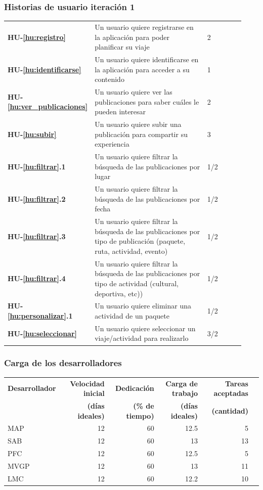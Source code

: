 \documentclass[spanish]{beamer}
\begin{document}
{\small
\begin{frame}[allowframebreaks=0.9]
	\frametitle{Historias de usuario iteración 1}
	\begin{longtable}{p{0.13\linewidth}p{0.65\linewidth}p{0.05\linewidth}p{0.05\linewidth}p{0.05\linewidth}}
		\textbf{HU-\ref{hu:registro}} & Un usuario quiere registrarse en la aplicación para poder planificar su viaje & 2\\
		\textbf{HU-\ref{hu:identificarse}} & Un usuario quiere identificarse en la aplicación para  acceder a su contenido & 1\\
		\textbf{HU-\ref{hu:ver_publicaciones}} & Un usuario quiere ver las publicaciones para saber cuáles le pueden interesar & 2\\
		\textbf{HU-\ref{hu:subir}} & Un usuario quiere subir una publicación para compartir su experiencia & 3\\
		\textbf{HU-\ref{hu:filtrar}.1} & Un usuario quiere filtrar la búsqueda de las publicaciones por lugar & 1/2 \\ 
		\textbf{HU-\ref{hu:filtrar}.2} & Un usuario quiere filtrar la búsqueda de las publicaciones por fecha & 1/2 \\
		\textbf{HU-\ref{hu:filtrar}.3} & Un usuario quiere filtrar la búsqueda de las publicaciones por tipo de publicación (paquete, ruta, actividad, evento) & 1/2 \\
		\textbf{HU-\ref{hu:filtrar}.4} & Un usuario quiere filtrar la búsqueda de las publicaciones por tipo de actividad (cultural, deportiva, etc)) & 1/2 \\
		\textbf{HU-\ref{hu:personalizar}.1} & Un usuario quiere eliminar una actividad de un paquete & 1/2\\ 
		\textbf{HU-\ref{hu:seleccionar}} & Un usuario quiere seleccionar un viaje/actividad para realizarlo & 3/2 \\
	\end{longtable}
\end{frame}
}

\begin{frame}
	\frametitle{Carga de los desarrolladores}
	\begin{table}[H]
	  \centering
	  \begin{adjustbox}{width=\textwidth}
	\begin{tabular}{lrrrrr}
	  \toprule
	  \textbf{Desarrollador} & \textbf{Velocidad inicial} & \textbf{Dedicación} & \textbf{Carga de trabajo} & \textbf{Tareas aceptadas} \\
	  & \textbf{(días ideales)} & \textbf{(\% de tiempo)} & \textbf{(días ideales)} & \textbf{ (cantidad)}\\
	  \midrule
	  MAP & 12 & 60 & 12.5 & 5\\
	  SAB & 12 & 60 & 13 & 13\\
	  PFC & 12 & 60 & 12.5 & 5\\
	  MVGP & 12 & 60 & 13 & 11\\
	  LMC & 12 & 60 & 12.2 & 10\\
	  \bottomrule
	\end{tabular}
	\end{adjustbox}
	\end{table}
\end{frame}
\end{document}
